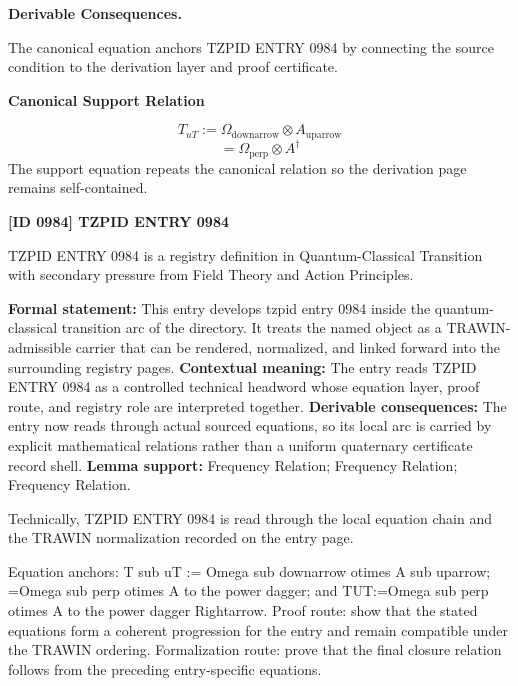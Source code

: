 \par\vspace{0.35em}
\noindent\textbf{Derivable Consequences.}\quad
\begingroup
\footnotesize
\raggedright
The canonical equation anchors TZPID ENTRY 0984 by connecting the source condition to the derivation layer and proof certificate.
\par\endgroup

\noindent\textbf{Canonical Support Relation}\par
\[
T_{uT} := \Omega_{\mathrm{downarrow}} \otimes A_{\mathrm{uparrow}}
\]
\[
=\Omega_{\mathrm{perp}}\otimes A^{\dagger}
\]
\noindent The support equation repeats the canonical relation so the derivation page remains self-contained.\par

\clearpage
\noindent\textbf{[ID 0984] TZPID ENTRY 0984}\par
\vspace{0.35em}
\begingroup\small
{}
TZPID ENTRY 0984 is a registry definition in Quantum-Classical Transition with secondary pressure from Field Theory and Action Principles.

\begingroup\footnotesize\setlength{\emergencystretch}{3em}\sloppy
\textbf{Formal statement:} This entry develops tzpid entry 0984 inside the quantum-classical transition arc of the directory. It treats the named object as a TRAWIN-admissible carrier that can be rendered, normalized, and linked forward into the surrounding registry pages. \textbf{Contextual meaning:} The entry reads TZPID ENTRY 0984 as a controlled technical headword whose equation layer, proof route, and registry role are interpreted together. \textbf{Derivable consequences:} The entry now reads through actual sourced equations, so its local arc is carried by explicit mathematical relations rather than a uniform quaternary certificate record shell. \textbf{Lemma support:} Frequency Relation; Frequency Relation; Frequency Relation.\par
\endgroup

Technically, TZPID ENTRY 0984 is read through the local equation chain and the TRAWIN normalization recorded on the entry page.

Equation anchors: T sub uT := Omega sub downarrow otimes A sub uparrow; =Omega sub perp otimes A to the power dagger; and TUT:=Omega sub perp otimes A to the power dagger Rightarrow. Proof route: show that the stated equations form a coherent progression for the entry and remain compatible under the TRAWIN ordering. Formalization route: prove that the final closure relation follows from the preceding entry-specific equations.

